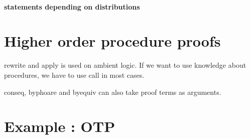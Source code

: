\paragraph{statements depending on distributions}



\section{Higher order procedure proofs}
rewrite and apply is used on ambient logic.
If we want to use knowledge about procedures, we have to use call in most cases.

conseq, byphoare and byequiv can also take proof terms as arguments.


\section{Example : OTP}
\label{sec:ec_opt}



